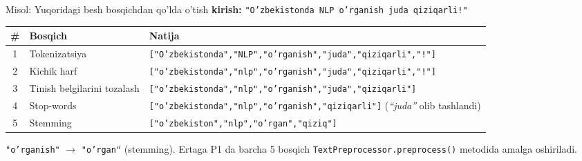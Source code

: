 \documentclass[aspectratio=169,11pt]{beamer}
\begin{document}
\begin{frame}{Misol: Yuqoridagi besh bosqichdan qo'lda o'tish}
  \textbf{kirish:} \texttt{"O'zbekistonda NLP o'rganish juda qiziqarli!"}
  \vspace{5pt}
  \begin{center}
  \begin{tabular}{clp{7.8cm}}
    \toprule
    \textbf{\#} & \textbf{Bosqich} & \textbf{Natija} \\
    \midrule
    1 & Tokenizatsiya &
      \texttt{\tiny["O'zbekistonda","NLP","o'rganish","juda","qiziqarli","!"]} \\[2pt]
    2 & Kichik harf &
      \texttt{\tiny["o'zbekistonda","nlp","o'rganish","juda","qiziqarli","!"]} \\[2pt]
    3 & Tinish belgilarini tozalash&
      \texttt{\tiny["o'zbekistonda","nlp","o'rganish","juda","qiziqarli"]} \\[2pt]
    4 & Stop-words &
      \texttt{\tiny["o'zbekistonda","nlp","o'rganish","qiziqarli"]}
      \footnotesize\;(\textit{``juda''} olib tashlandi) \\[2pt]
    5 & Stemming &
      \texttt{\tiny["o'zbekiston","nlp","o'rgan","qiziq"]} \\
    \bottomrule
  \end{tabular}
  \end{center}
  \vspace{4pt}
  \begin{tcolorbox}[okbox,title=Muhim kuzatuv,top=2pt,bottom=2pt]
    \footnotesize
    \texttt{"o'rganish"} $\to$ \texttt{"o'rgan"} (stemming).
    Ertaga P1 da barcha 5 bosqich \texttt{TextPreprocessor.preprocess()} metodida
    amalga oshiriladi.
  \end{tcolorbox}
\end{frame}
\end{document}
